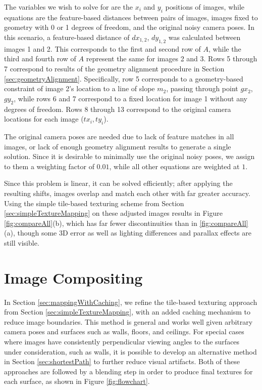 \documentclass[]{spie}  %
\begin{document}
The variables we wish to solve for are the $x_i$ and $y_i$ positions
of images, while equations are the feature-based distances between
pairs of images, images fixed to geometry with 0 or 1 degrees of
freedom, and the original noisy camera poses. In this scenario, a
feature-based distance of $dx_{1,2}$, $dy_{1,2}$ was calculated
between images 1 and 2. This corresponds to the first and second row
of $A$, while the third and fourth row of $A$ represent the same for
images 2 and 3. Rows 5 through 7 correspond to results of the geometry
alignment procedure in Section
\ref{sec:geometryAlignment}. Specifically, row 5 corresponds to a
geometry-based constraint of image 2's location to a line of slope
$m_2$, passing through point $gx_2$, $gy_2$, while rows 6 and 7
correspond to a fixed location for image 1 without any degrees of
freedom. Rows 8 through 13 correspond to the original camera locations
for each image ($tx_i,ty_i$).

The original camera poses are needed due to lack of feature matches in
all images, or lack of enough geometry alignment results to generate a
single solution. Since it is desirable to minimally use the original
noisy poses, we assign to them a weighting factor of $0.01$, while all
other equations are weighted at $1$.


Since this problem is linear, it can be solved efficiently; after
applying the resulting shifts, images overlap and match each other
with far greater accuracy. Using the simple tile-based texturing
scheme from Section \ref{sec:simpleTextureMapping} on these adjusted
images results in Figure \ref{fig:compareAll}(b), which has far fewer
discontinuities than in \ref{fig:compareAll}(a), though some 3D error
as well as lighting differences and parallax effects are still
visible.

\section{Image Compositing}
\label{sec:imageCompositing}
In Section \ref{sec:mappingWithCaching}, we refine the tile-based
texturing approach from Section \ref{sec:simpleTextureMapping}, with
an added caching mechanism to reduce image boundaries. This method is
general and works well given arbitrary camera poses and surfaces such
as walls, floors, and ceilings. For special cases where images have
consistently perpendicular viewing angles to the surfaces under
consideration, such as walls, it is possible to develop an alternative
method in Section \ref{sec:shortestPath} to further reduce visual
artifacts. Both of these approaches are followed by a blending step in
order to produce final textures for each surface, as shown in Figure
\ref{fig:flowchart}.
\end{document}
